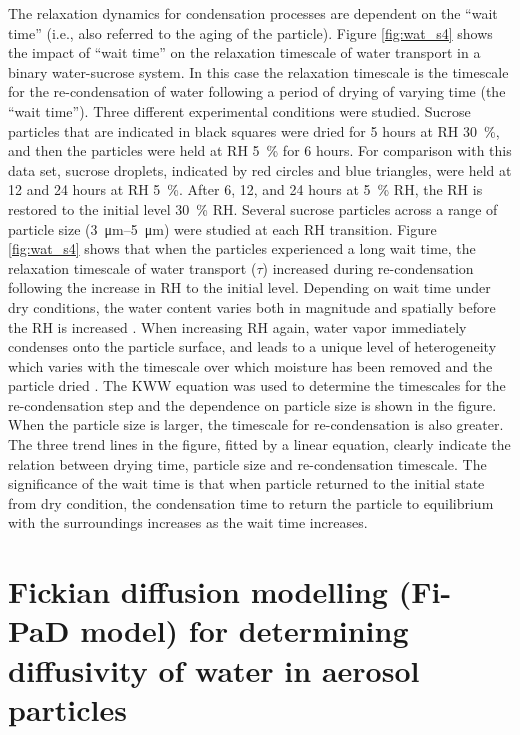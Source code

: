The relaxation dynamics for condensation processes are dependent on the ``wait time'' (i.e., also referred to the aging of the particle). Figure \ref{fig:wat_s4} shows the impact of ``wait time'' on the relaxation timescale of water transport in a binary water-sucrose system. In this case the relaxation timescale is the timescale for the re-condensation of water following a period of drying of varying time (the ``wait time''). Three different experimental conditions were studied. Sucrose particles that are indicated in black squares were dried for \num{5} hours at RH \SI{30}{\percent}, and then the particles were held at RH \SI{5}{\percent} for \num{6} hours. For comparison with this data set, sucrose droplets, indicated by red circles and blue triangles, were held at \num{12} and \num{24} hours at RH \SI{5}{\percent}. After \num{6}, \num{12}, and \num{24} hours at \SI{5}{\percent} RH, the RH is restored to the initial level \SI{30}{\percent} RH. Several sucrose particles across a range of particle size (\SIrange[range-phrase=\text{--}]{3}{5}{\micro\meter}) were studied at each RH transition. Figure \ref{fig:wat_s4} shows that when the particles experienced a long wait time, the relaxation timescale of water transport ($\tau$) increased during re-condensation following the increase in RH to the initial level. Depending on wait time under dry conditions, the water content varies both in magnitude and spatially before the RH is increased \cite{Rickards2015}. When increasing RH again, water vapor immediately condenses onto the particle surface, and leads to a unique level of heterogeneity which varies with the timescale over which moisture has been removed and the particle dried \cite{Rickards2015,luTimescalesWaterTransport2014}. The KWW equation was used to determine the timescales for the re-condensation step and the dependence on particle size is shown in the figure. When the particle size is larger, the timescale for re-condensation is also greater. The three trend lines in the figure, fitted by a linear equation, clearly indicate the relation between drying time, particle size and re-condensation timescale. The significance of the wait time is that when particle returned to the initial state from dry condition, the condensation time to return the particle to equilibrium with the surroundings increases as the wait time increases. 


\clearpage

\section{Fickian diffusion modelling (Fi-PaD model) for determining diffusivity of water in aerosol particles}

